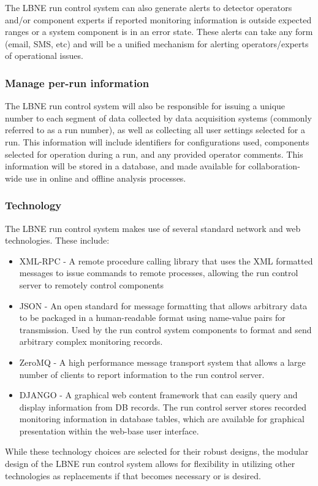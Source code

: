 The LBNE run control system can also generate alerts to detector
operators and/or component experts if reported monitoring information
is outside expected ranges or a system component is in an error state.
These alerts can take any form (email, SMS, etc) and will be a unified
mechanism for alerting operators/experts of operational issues.

\subsubsection{Manage per-run information}
The LBNE run control system will also be responsible for issuing a
unique number to each segment of data collected by data acquisition
systems (commonly referred to as a run number), as well as collecting
all user settings selected for a run.  This information will include
identifiers for configurations used, components selected for operation
during a run, and any provided operator comments.  This information
will be stored in a database, and made available for
collaboration-wide use in online and offline analysis processes.

\subsubsection{Technology}
The LBNE run control system makes use of several standard network and
web technologies.  These include:
\begin{itemize}
\item{XML-RPC - A remote procedure calling library that uses the XML
    formatted messages to issue commands to remote processes, allowing
    the run control server to remotely control components}
\item{JSON - An open standard for message formatting that allows
    arbitrary data to be packaged in a human-readable format using
    name-value pairs for transmission.  Used by the run control system
    components to format and send arbitrary complex monitoring
    records.}
\item{ZeroMQ - A high performance message transport system that allows
    a large number of clients to report information to the run control
    server.}
\item{DJANGO - A graphical web content framework that can easily query
    and display information from DB records.  The run control server
    stores recorded monitoring information in database tables, which
    are available for graphical presentation within the web-base user
    interface.}
\end{itemize}
While these technology choices are selected for their robust designs,
the modular design of the LBNE run control system allows for
flexibility in utilizing other technologies as replacements if that
becomes necessary or is desired.

